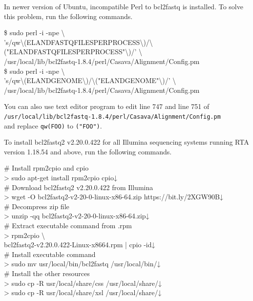 \documentclass[titlepage,10pt,a4paper,english]{jsbook}
\newenvironment{cmd}{\begin{oframed}\raggedright\ttfamily\footnotesize\setlength{\baselineskip}{1.4em}}{\end{oframed}\vspace{-1em}}
\begin{document}
In newer version of Ubuntu, incompatible Perl to bcl2fastq is installed.
To solve this problem, run the following commands.

\begin{cmd}
\$ sudo perl -i -npe {\textbackslash}\\
's/qw{\textbackslash}(ELAND{\textunderscore}FASTQ{\textunderscore}FILES{\textunderscore}PER{\textunderscore}PROCESS{\textbackslash})/{\textbackslash}("ELAND{\textunderscore}FASTQ{\textunderscore}FILES{\textunderscore}PER{\textunderscore}PROCESS"{\textbackslash})/' {\textbackslash}\\
/usr/local/lib/bcl2fastq-1.8.4/perl/Casava/Alignment/Config.pm\\
\$ sudo perl -i -npe {\textbackslash}\\
's/qw{\textbackslash}(ELAND{\textunderscore}GENOME{\textbackslash})/{\textbackslash}("ELAND{\textunderscore}GENOME"{\textbackslash})/' {\textbackslash}\\
/usr/local/lib/bcl2fastq-1.8.4/perl/Casava/Alignment/Config.pm
\end{cmd}

You can also use text editor program to edit line 747 and line 751 of\\
\texttt{/usr/local/lib/bcl2fastq-1.8.4/perl/Casava/Alignment/Config.pm}\\
and replace \texttt{qw(FOO)} to \texttt{("FOO")}.

To install bcl2fastq2 v2.20.0.422 for all Illumina sequencing systems running RTA version 1.18.54 and above, run the following commands.

\begin{cmd}
\# Install rpm2cpio and cpio\\
{\textgreater} sudo apt-get install rpm2cpio cpio↓\\
\# Download bcl2fastq2 v2.20.0.422 from Illumina\\
{\textgreater} wget -O bcl2fastq2-v2-20-0-linux-x86-64.zip https://bit.ly/2XGW90B↓\\
\# Decompress zip file\\
{\textgreater} unzip -qq bcl2fastq2-v2-20-0-linux-x86-64.zip↓\\
\# Extract executable command from .rpm\\
{\textgreater} rpm2cpio {\textbackslash}\\
bcl2fastq2-v2.20.0.422-Linux-x86{\textunderscore}64.rpm | cpio -id↓\\
\# Install executable command\\
{\textgreater} sudo mv usr/local/bin/bcl2fastq /usr/local/bin/↓\\
\# Install the other resources\\
{\textgreater} sudo cp -R usr/local/share/css /usr/local/share/↓\\
{\textgreater} sudo cp -R usr/local/share/xsl /usr/local/share/↓
\end{cmd}
\end{document}
